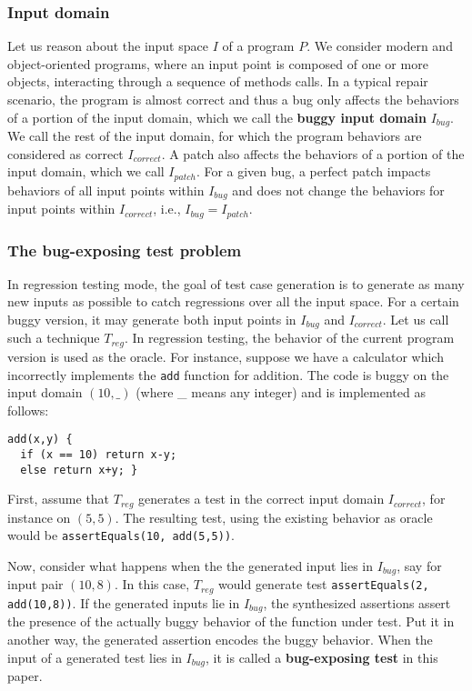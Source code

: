 \documentclass[]{sig-alternate}
\begin{document}
\subsubsection{Input domain}
Let us reason about the input space $I$ of a program $P$.
We consider modern and object-oriented programs, where an input point is composed of one or more objects, interacting through a sequence of methods calls. 
In a typical repair scenario, the program is almost correct and thus
a bug only affects the behaviors of a portion of the input domain, which we call the \textbf{buggy input domain} $I_{bug}$.
We call the rest of the input domain, for which the program behaviors are considered as correct $I_{correct}$. 
A patch also affects the behaviors of a portion of the input domain, which we call $I_{patch}$.
For a given bug, a perfect patch impacts behaviors of all input points within $I_{bug}$ and does not change the behaviors for input points within $I_{correct}$, i.e., $I_{bug} = I_{patch}$. 



\subsubsection{The bug-exposing test problem}

In regression testing mode, the goal of test case generation is to generate as many new inputs as possible to catch regressions over all the input space. For a certain buggy version, it may generate both input points in $I_{bug}$ and $I_{correct}$. Let us call such a technique $T_{reg}$. 
In regression testing, the behavior of the current program version is used as the oracle. For instance, suppose we have a calculator which incorrectly implements the \texttt{add} function for addition. The code is buggy on the input domain $(10, \_)$ (where \_ means any integer) and is implemented as follows:
\begin{verbatim}
add(x,y) {
  if (x == 10) return x-y;
  else return x+y; }
\end{verbatim}


First, assume that $T_{reg}$ generates a test in the correct input domain $I_{correct}$, for instance on $(5,5)$.
The resulting test, using the existing behavior as oracle would be \texttt{assertEquals(10, add(5,5))}. 

Now, consider what happens when the the generated input lies in $I_{bug}$, say for input pair $(10,8)$.
In this case, $T_{reg}$ would generate test \texttt{assertEquals(2, add(10,8))}.
If the generated inputs lie in $I_{bug}$, the synthesized assertions assert the presence of the actually buggy behavior of the function under test. Put it in another way, the generated assertion encodes the buggy behavior. When the input of a generated test lies in $I_{bug}$, it is called a \textbf{bug-exposing test} in this paper. 
\end{document}
